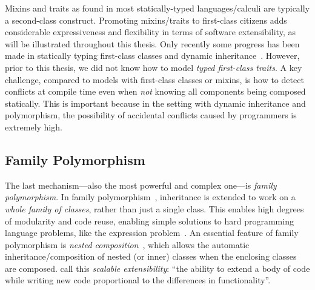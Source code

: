Mixins and traits as found in most statically-typed languages/calculi are
typically a second-class construct. Promoting mixins/traits to first-class
citizens adds considerable expressiveness and flexibility in terms of software
extensibility, as will be illustrated throughout this thesis. Only recently some
progress has been made in statically typing first-class classes and dynamic
inheritance~\citep{DBLP:conf/oopsla/TakikawaSDTF12,DBLP:conf/ecoop/LeeASP15}.
However, prior to this thesis, we did not know how to model \textit{typed
  first-class traits}. A key challenge, compared to models with first-class
classes or mixins, is how to detect conflicts at compile time even when \textit{not}
knowing all components being composed statically. This is important because in
the setting with dynamic inheritance and polymorphism, the possibility of
accidental conflicts caused by programmers is extremely high.



\subsection{Family Polymorphism}

The last mechanism---also the most powerful and complex one---is \emph{family
  polymorphism}. In family polymorphism~\citep{Ernst_2001}, inheritance is
extended to work on a \emph{whole family of classes}, rather than just a single
class. This enables high degrees of modularity and code reuse, enabling simple
solutions to hard programming language problems, like the expression
problem~\citep{wadler1998expression}. An essential feature of family
polymorphism is \emph{nested composition}~\citep{Corradi_2012,
  ErnstVirtual,Nystrom_2004}, which allows the automatic inheritance/composition
of nested (or inner) classes when the enclosing classes are composed.
\citet{Nystrom_2004} call this \emph{scalable extensibility}: ``the ability to
extend a body of code while writing new code proportional to the differences in
functionality''.

